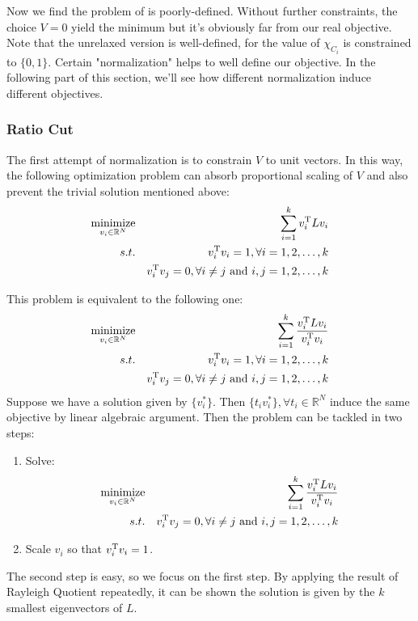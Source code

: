 Now we find the problem of \req{\ref{eq:cut_relax}} is poorly-defined. 
Without further constraints, the choice $ V=0 $ yield the minimum
but it's obviously far from our real objective. Note that the unrelaxed
version is well-defined, for the value of $ \chi_{C_i} $ is constrained 
to $ \{0,1\} $. Certain "normalization" helps to well define our objective. 
In the following part of this section, we'll see 
how different normalization induce different objectives. 

\subsubsection{Ratio Cut}	
\label{sec:rcut}

The first attempt of normalization is to constrain $ V $ 
to unit vectors. In this way, the following optimization 
problem can absorb proportional scaling of $ V $
and also prevent the trivial solution mentioned above:
\begin{eqnarray}
	\operatorname*{minimize}_{v_i \in \mathbb{R}^N} 
	&& { \sum_{i=1}^{k}{v_i^\mathrm{T}Lv_i} } \nonumber \\
	s.t. && v_i^\mathrm{T}v_i = 1, \forall i=1,2,\ldots,k \nonumber \\
		 && v_i^\mathrm{T}v_j = 0, \forall i \ne j \text{~and~} i,j=1,2,\ldots,k\label{eq:rcut_opt1}
\end{eqnarray}

This problem is equivalent to the following one:
\begin{eqnarray}
	\operatorname*{minimize}_{v_i \in \mathbb{R}^N} 
	&& { \sum_{i=1}^{k}{ \frac{v_i^\mathrm{T}Lv_i}{v_i^\mathrm{T}v_i} } } \nonumber \\
	s.t. && v_i^\mathrm{T}v_i = 1, \forall i=1,2,\ldots,k \nonumber \\
		 && v_i^\mathrm{T}v_j = 0, \forall i \ne j \text{~and~} i,j=1,2,\ldots,k\label{eq:rcut_opt2}
\end{eqnarray}
Suppose we have a solution given by $ \{v^*_i\} $. Then 
$ \{t_i v^*_i\}, \forall t_i \in \mathbb{R}^N $ induce the 
same objective by linear algebraic argument. Then the problem can be 
tackled in two steps:
\begin{enumerate}
	\item Solve: 
		\begin{eqnarray}
			\operatorname*{minimize}_{v_i \in \mathbb{R}^N} 
			&& { \sum_{i=1}^{k}{ \frac{v_i^\mathrm{T}Lv_i}{v_i^\mathrm{T}v_i} } } \nonumber \\
		 s.t. && v_i^\mathrm{T}v_j = 0, \forall i \ne j 
		 \text{~and~} i,j=1,2,\ldots,k\label{eq:rcut_opt3}
		\end{eqnarray}
	\item Scale $ v_i $ so that $ v_i^\mathrm{T}v_i = 1 $.
\end{enumerate}
The second step is easy, so we focus on the first step. 
By applying the result of Rayleigh Quotient
repeatedly\cite{lau-2012-spectral-ln}, it can be shown the solution 
is given by the $ k $ smallest eigenvectors of $ L $. 

